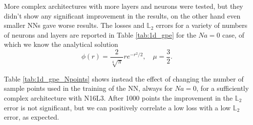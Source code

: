 \documentclass[a4paper, titlepage]{article}
\begin{document}
More complex architectures with more layers and neurons were tested, but they
didn't show any significant improvement in the results, on the other hand even
smaller NNs gave worse results.
The losses and $\mathbb L_2$ errors for a variety of numbers of neurons and 
layers are reported in Table \ref{tab:1d_gpe} for the $Na = 0$ case, of which 
we know the analytical solution 
\begin{equation*}
    \phi(r) = \frac{2}{\sqrt[4]{\pi}} r e^{-r^2/2}, \quad \mu = \frac{3}{2}.
\end{equation*}

Table \ref{tab:1d_gpe_Npoints} shows instead the effect of changing the number
of sample points used in the training of the NN, always for $Na = 0$, for a
sufficiently complex architecture with N16L3.
After 1000 points the improvement in the $\mathbb L_2$ error is not significant,
but we can positively correlate a low loss with a low $\mathbb L_2$ error, as 
expected.
\end{document}
